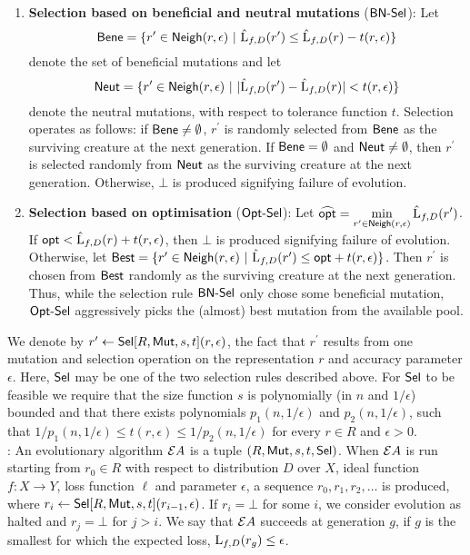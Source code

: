 \begin{enumerate}
\item {\bf Selection based on beneficial and neutral mutations} ($\mathsf{BN\mbox{-}Sel}$): Let 
%
\[ \mathsf{Bene} = \{r^\prime \in \mathsf{Neigh}(r, \epsilon) ~|~ \hat{\mathrm{L}}_{f, D}(r^\prime) \leq
\hat{\mathrm{L}}_{f, D}(r) - t(r, \epsilon) \} \]  
%
denote the set of beneficial mutations and let 
%
\[ \mathsf{Neut} = \{r^\prime \in \mathsf{Neigh}(r, \epsilon) ~|~ |\hat{\mathrm{L}}_{f, D}(r^\prime) -
\hat{\mathrm{L}}_{f, D}(r)| <  t(r, \epsilon) \} \]
%
denote the neutral mutations, with respect to tolerance function $t$. Selection
operates as follows: if $\mathsf{Bene} \neq \emptyset$, $r^\prime$ is randomly selected
from $\mathsf{Bene}$ as the surviving creature at the next generation.  If $\mathsf{Bene} =
\emptyset$ and $\mathsf{Neut} \neq\emptyset$, then $r^\prime$ is selected randomly from
$\mathsf{Neut}$ as the surviving creature at the next generation.  Otherwise, $\bot$ is
produced signifying failure of evolution.
%
\item {\bf Selection based on optimisation} ($\mathsf{Opt\mbox{-}Sel}$): Let $\widehat{\mathsf{opt}} =
\displaystyle\min_{r^\prime \in \mathsf{Neigh}(r, \epsilon)} \hat{\mathrm{L}}_{f, D}(r^\prime)$.
If $\mathsf{opt} < \hat{\mathrm{L}}_{f, D}(r) + t(r, \epsilon)$, then $\bot$ is produced
signifying failure of evolution.  Otherwise, let $\mathsf{Best} = \{ r^\prime \in
\mathsf{Neigh}(r, \epsilon) ~|~ \hat{\mathrm{L}}_{f, D}(r^\prime) \leq \mathsf{opt} + t(r, \epsilon) \}$.
Then $r^\prime$ is chosen from $\mathsf{Best}$ randomly as the surviving creature at the
next generation. Thus, while the selection rule $\mathsf{BN\mbox{-}Sel}$ only chose some
beneficial mutation, $\mathsf{Opt\mbox{-}Sel}$ aggressively picks the (almost) best mutation
from the available pool.
\end{enumerate}

We denote by $r^\prime \leftarrow \mathsf{Sel}[R, \mathsf{Mut}, s, t](r, \epsilon)$, the fact
that $r^\prime$ results from one mutation and selection operation on the
representation $r$ and accuracy parameter $\epsilon$. Here, $\mathsf{Sel}$ may be one of
the two selection rules described above. For $\mathsf{Sel}$ to be feasible we require
that the size function $s$ is polynomially (in $n$ and $1/\epsilon$) bounded and
that there exists polynomials $p_1(n, 1/\epsilon)$ and $p_2(n, 1/\epsilon)$,
such that $1/p_1(n, 1/\epsilon) \leq t(r, \epsilon) \leq 1/p_2(n, 1/\epsilon)$ for
every $r \in R$ and $\epsilon > 0$. \medskip \\
%
: An evolutionary algorithm ${\mathcal EA}$ is a
tuple $(R, \mathsf{Mut}, s, t, \mathsf{Sel})$. When ${\mathcal EA}$ is run starting from $r_0 \in R$
with respect to distribution $D$ over $X$, ideal function $f : X \rightarrow Y$,
loss function $\ell$ and parameter $\epsilon$, a sequence $r_0, r_1, r_2,
\ldots$ is produced, where $r_i \leftarrow \mathsf{Sel}[R, \mathsf{Mut}, s, t](r_{i - 1},
\epsilon)$. If $r_i = \bot$ for some $i$, we consider evolution as halted and
$r_j = \bot$ for $j > i$. We say that ${\mathcal EA}$ succeeds at generation $g$, if
$g$ is the smallest for which the expected loss, $\mathrm{L}_{f, D}(r_g) \leq
\epsilon$.

